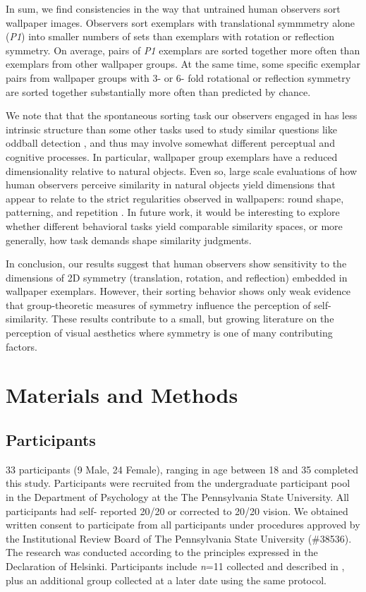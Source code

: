 \documentclass[11pt, twoside]{article}
\begin{document}
In sum, we find consistencies in the way that untrained human observers sort wallpaper images. Observers sort exemplars with translational symmmetry alone (\textit{P1}) into smaller numbers of sets than exemplars with rotation or reflection symmetry. On average, pairs of \textit{P1} exemplars are sorted together more often than exemplars from other wallpaper groups. At the same time, some specific exemplar pairs from wallpaper groups with 3- or 6- fold rotational or reflection symmetry are sorted together substantially more often than predicted by chance.

We note that that the spontaneous sorting task our observers engaged in has less intrinsic structure than some other tasks used to study similar questions like oddball detection \citep{RN1253,Hebart2020-so,Landwehr2011-kg}, and thus may involve somewhat different perceptual and cognitive processes. In particular, wallpaper group exemplars have a reduced dimensionality relative to natural objects. Even so, large scale evaluations of how human observers perceive similarity in natural objects yield dimensions that appear to relate to the strict regularities observed in wallpapers: round shape, patterning, and repetition \citep{Hebart2020-so}. In future work, it would be interesting to explore whether different behavioral tasks yield comparable similarity spaces, or more generally, how task demands shape similarity judgments.

In conclusion, our results suggest that human observers show sensitivity to the dimensions of 2D symmetry (translation, rotation, and reflection) embedded in wallpaper exemplars. However, their sorting behavior shows only weak evidence that group-theoretic measures of symmetry influence the perception of self-similarity. These results contribute to a small, but growing literature on the perception of visual aesthetics \citep{Carneiro2012-ph,Graham2010-yf,Friedenberg2012-gf,Laine-Hernandez2008-sg,Richards1972-gl} where symmetry is one of many contributing factors.

\section*{Materials and Methods}
\label{methods}

\subsection*{Participants}
33 participants (9 Male, 24 Female), ranging in age between 18 and 35 completed this study. Participants were recruited from the undergraduate participant pool in the Department of Psychology at the The Pennsylvania State University. All participants had self- reported 20/20 or corrected to 20/20 vision. We obtained written consent to participate from all participants under procedures approved by the Institutional Review Board of The Pennsylvania State University (\#38536). The research was conducted according to the principles expressed in the Declaration of Helsinki. Participants include \textit{n}=11 collected and described in \citep{vedak_thesis}, plus an additional group collected at a later date using the same protocol.
\end{document}

